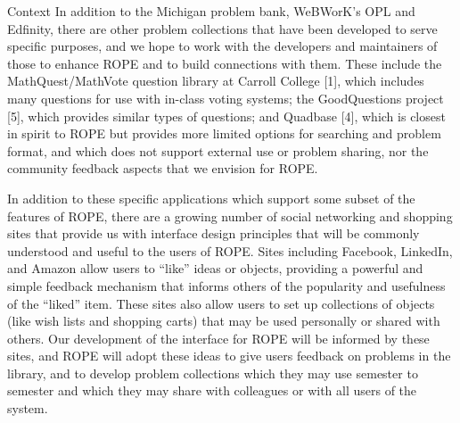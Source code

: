 \documentclass[11pt]{article}
\begin{document}
\begin{section}{Context}
In addition to the Michigan problem bank, WeBWorK's OPL and Edfinity, there are
other problem collections that have been developed to serve specific
purposes, and we hope to work with the developers and maintainers of those
to enhance ROPE and to build connections with them.  These include the
MathQuest/MathVote question library at Carroll College [1], %
which includes many questions for use with in-class voting systems; the
GoodQuestions project [5], %
which provides similar types of
questions; and Quadbase [4], %
which is closest in spirit to ROPE but provides more limited options for 
searching and problem format,
and which does not support external use or problem sharing, nor the
community feedback aspects that we envision for ROPE.  

In addition to these specific applications which support some subset of
the features of ROPE, there are a growing number of social networking
and shopping sites that provide us with interface design principles that
will be commonly understood and useful to the users of ROPE.  Sites
including Facebook, LinkedIn, and Amazon allow users to ``like'' ideas or
objects, providing a powerful and simple feedback mechanism that informs
others of the popularity and usefulness of the ``liked'' item.  These
sites also allow users to set up collections of objects (like wish lists
and shopping carts) that may be used personally or shared with others.
Our development of the interface for ROPE will be informed by these
sites, and ROPE will adopt these ideas to give users feedback on
problems in the library, and to develop problem collections which they may
use semester to semester and which they may share with colleagues or with
all users of the system.


\end{section}
\end{document}

